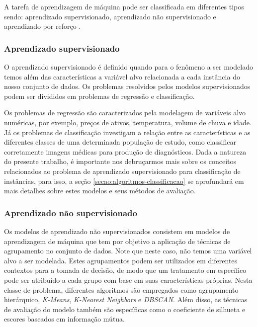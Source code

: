 A tarefa de aprendizagem de máquina pode ser classificada em diferentes tipos sendo: aprendizado supervisionado, aprendizado não supervisionado e aprendizado por reforço \cite{bishopPatternRecognitionMachine2006}.

\subsubsection{Aprendizado supervisionado}

O aprendizado supervisionado é definido quando para o fenômeno a ser modelado temos além das características a variável alvo relacionada a cada instância do nosso conjunto de dados. Os problemas resolvidos pelos modelos supervisionados podem ser divididos em problemas de regressão e classificação.

Os problemas de regressão são caracterizados pela modelagem de variáveis alvo numéricas, por exemplo, preços de ativos, temperatura, volume de chuva e idade.
Já os problemas de classificação investigam a relação entre as características e as diferentes classes de uma determinada população de estudo, como classificar corretamente imagens médicas para produção de diagnósticos.
Dada a natureza do presente trabalho, é importante nos debruçarmos mais sobre os conceitos relacionados ao problema de aprendizado supervisionado para classificação de instâncias, para isso, a seção \ref{secao:algoritmos-classificacao} se aprofundará em mais detalhes sobre estes modelos e seus métodos de avaliação.

\subsubsection{Aprendizado não supervisionado}

Os modelos de aprendizado não supervisionados consistem em modelos de aprendizagem de máquina que tem por objetivo a aplicação de técnicas de agrupamento no conjunto de dados.
Note que neste caso, não temos uma variável alvo a ser modelada.
Estes agrupamentos podem ser utilizados em diferentes contextos para a tomada de decisão, de modo que um tratamento em específico pode ser atribuído a cada grupo com base em suas características próprias.
Nesta classe de problema, diferentes algoritmos são empregados como agrupamento hierárquico, \textit{K-Means}, \textit{K-Nearest Neighbors} e \textit{DBSCAN}. Além disso, as técnicas de avaliação do modelo também são específicas como o coeficiente de silhueta e escores baseados em informação mútua.

